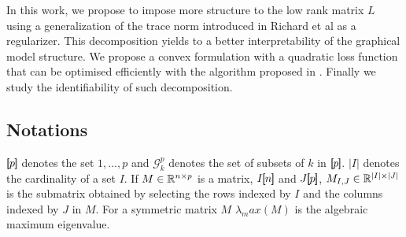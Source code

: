 In this work, we propose to impose more structure to the low rank matrix $L$ using a generalization of the trace norm introduced in Richard et al as a regularizer. This decomposition yields to a better interpretability of the graphical model structure. We propose a convex formulation with a quadratic loss function that can be optimised efficiently with the algorithm proposed in \citet{vinyes2017}.  Finally we study the identifiability of such decomposition. 

\subsection*{Notations}
$[\!\![p]\!\!]$ denotes the set ${1,...,p}$ and $\mathcal{G}^p_k$ denotes the
set of subsets of $k$ in $[\!\![p]\!\!]$. $|I|$ denotes the cardinality of a set $I$. If $M\in\mathbb{R}^{n\times p}$ is a matrix, $I[\!\![n]\!\!]$ and $J[\!\![p]\!\!]$, $M_{I,J}\in\mathbb{R}^{|I|\times |J|}$ is the submatrix obtained by selecting the rows indexed by $I$ and the columns indexed by $J$ in $M$. For a symmetric matrix $M$ $\lambda_max(M)$ is the algebraic maximum eigenvalue.

%
